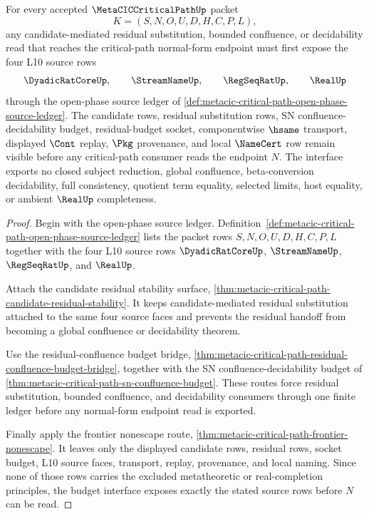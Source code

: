 \begin{theorem}
\label{thm:metacic-critical-path-candidate-residual-budget-interface}
For every accepted $\MetaCICCriticalPathUp$ packet
$$
K=(S,N,O,U,D,H,C,P,L),
$$
any candidate-mediated residual substitution, bounded confluence, or decidability read that reaches the critical-path normal-form endpoint must first expose the four L10 source rows
$$
\DyadicRatCoreUp,\qquad
\StreamNameUp,\qquad
\RegSeqRatUp,\qquad
\RealUp
$$
through the open-phase source ledger of \autoref{def:metacic-critical-path-open-phase-source-ledger}. The candidate rows, residual substitution rows, SN confluence-decidability budget, residual-budget socket, componentwise $\hsame$ transport, displayed $\Cont$ replay, $\Pkg$ provenance, and local $\NameCert$ row remain visible before any critical-path consumer reads the endpoint $N$. The interface exports no closed subject reduction, global confluence, beta-conversion decidability, full consistency, quotient term equality, selected limits, host equality, or ambient $\RealUp$ completeness.
\end{theorem}
\begin{proof}
Begin with the open-phase source ledger. Definition~\ref{def:metacic-critical-path-open-phase-source-ledger} lists the packet rows $S,N,O,U,D,H,C,P,L$ together with the four L10 source rows $\DyadicRatCoreUp$, $\StreamNameUp$, $\RegSeqRatUp$, and $\RealUp$.

Attach the candidate residual stability surface, \autoref{thm:metacic-critical-path-candidate-residual-stability}. It keeps candidate-mediated residual substitution attached to the same four source faces and prevents the residual handoff from becoming a global confluence or decidability theorem.

Use the residual-confluence budget bridge, \autoref{thm:metacic-critical-path-residual-confluence-budget-bridge}, together with the SN confluence-decidability budget of \autoref{thm:metacic-critical-path-sn-confluence-budget}. These routes force residual substitution, bounded confluence, and decidability consumers through one finite ledger before any normal-form endpoint read is exported.

Finally apply the frontier nonescape route, \autoref{thm:metacic-critical-path-frontier-nonescape}. It leaves only the displayed candidate rows, residual rows, socket budget, L10 source faces, transport, replay, provenance, and local naming. Since none of those rows carries the excluded metatheoretic or real-completion principles, the budget interface exposes exactly the stated source rows before $N$ can be read.
\end{proof}


